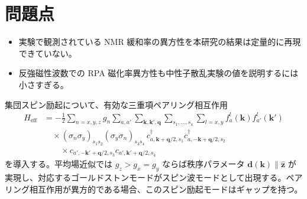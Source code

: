 \documentclass[a4paper,11pt]{jsarticle}
\begin{document}
\section*{問題点}
\begin{itemize}
  \item 実験で観測されている NMR 緩和率の異方性を本研究の結果は定量的に再現できていない。
  \item 反強磁性波数での RPA 磁化率異方性も中性子散乱実験の値を説明するには小さすぎる。
\end{itemize}

集団スピン励起について、有効な三重項ペアリング相互作用
\begin{align}
H_{\mathrm{eff}} &= -\tfrac{1}{2}\sum_{n=x,y,z} g_n
  \sum_{a,a'} \sum_{\bm{k},\bm{k}',\bm{q}}
  \sum_{s_1,\dots,s_4} \sum_{l=x,y}
  f_a^l(\bm{k}) f_{a'}^l(\bm{k}')
  \nonumber\\
&\quad\times (\sigma_n\sigma_y)_{s_1 s_2} (\sigma_y\sigma_n)_{s_3 s_4}
  \,c^\dagger_{a,\bm{k}+\bm{q}/2,s_1}
  c^\dagger_{a,-\bm{k}+\bm{q}/2,s_2}
  \nonumber\\
&\quad\quad\times c_{a',-\bm{k}'+\bm{q}/2,s_3}
  c_{a',\bm{k}'+\bm{q}/2,s_4}
\end{align}
を導入する。平均場近似では $g_z > g_x = g_y$ ならば秩序パラメータ $\bm{d}(\bm{k})\parallel\hat{\bm{z}}$ が実現し、対応するゴールドストンモードがスピン波モードとして出現する。ペアリング相互作用が異方的である場合、このスピン励起モードはギャップを持つ。
\end{document}
